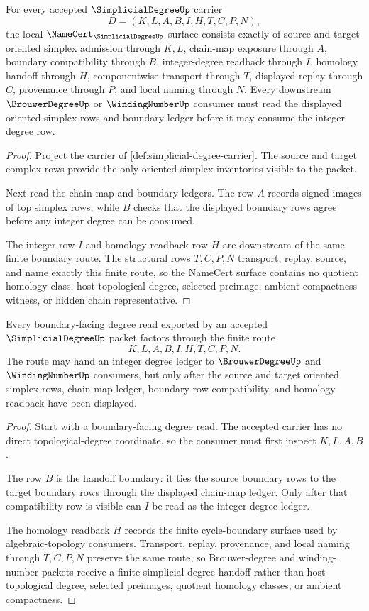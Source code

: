 \begin{theorem}
\label{thm:simplicial-degree-namecert-obligations}
For every accepted $\SimplicialDegreeUp$ carrier
$$
D=(K,L,A,B,I,H,T,C,P,N),
$$
the local $\NameCert_{\SimplicialDegreeUp}$ surface consists exactly of source and target oriented simplex admission through $K,L$, chain-map exposure through $A$, boundary compatibility through $B$, integer-degree readback through $I$, homology handoff through $H$, componentwise transport through $T$, displayed replay through $C$, provenance through $P$, and local naming through $N$. Every downstream $\BrouwerDegreeUp$ or $\WindingNumberUp$ consumer must read the displayed oriented simplex rows and boundary ledger before it may consume the integer degree row.
\end{theorem}
\begin{proof}
Project the carrier of \autoref{def:simplicial-degree-carrier}. The source and target complex rows provide the only oriented simplex inventories visible to the packet.

Next read the chain-map and boundary ledgers. The row $A$ records signed images of top simplex rows, while $B$ checks that the displayed boundary rows agree before any integer degree can be consumed.

The integer row $I$ and homology readback row $H$ are downstream of the same finite boundary route. The structural rows $T,C,P,N$ transport, replay, source, and name exactly this finite route, so the NameCert surface contains no quotient homology class, host topological degree, selected preimage, ambient compactness witness, or hidden chain representative.
\end{proof}

\begin{theorem}
\label{thm:simplicial-degree-boundary-handoff}
Every boundary-facing degree read exported by an accepted $\SimplicialDegreeUp$ packet factors through the finite route
$$
K,L,A,B,I,H,T,C,P,N.
$$
The route may hand an integer degree ledger to $\BrouwerDegreeUp$ and $\WindingNumberUp$ consumers, but only after the source and target oriented simplex rows, chain-map ledger, boundary-row compatibility, and homology readback have been displayed.
\end{theorem}
\begin{proof}
Start with a boundary-facing degree read. The accepted carrier has no direct topological-degree coordinate, so the consumer must first inspect $K,L,A,B$.

The row $B$ is the handoff boundary: it ties the source boundary rows to the target boundary rows through the displayed chain-map ledger. Only after that compatibility row is visible can $I$ be read as the integer degree ledger.

The homology readback $H$ records the finite cycle-boundary surface used by algebraic-topology consumers. Transport, replay, provenance, and local naming through $T,C,P,N$ preserve the same route, so Brouwer-degree and winding-number packets receive a finite simplicial degree handoff rather than host topological degree, selected preimages, quotient homology classes, or ambient compactness.
\end{proof}

